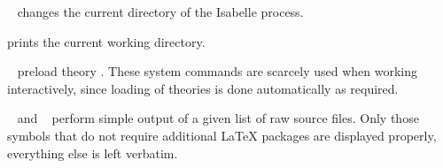 \begin{isabellebody}
\begin{isamarkuptext}
  \begin{descr}

  \item [\hyperlink{command.cd}{\mbox{\isa{\isacommand{cd}}}}~\isa{path}] changes the current directory
  of the Isabelle process.

  \item [\hyperlink{command.pwd}{\mbox{\isa{\isacommand{pwd}}}}] prints the current working directory.

  \item [\hyperlink{command.use-thy}{\mbox{\isa{\isacommand{use{\isacharunderscore}thy}}}}~\isa{A}] preload theory .
  These system commands are scarcely used when working interactively,
  since loading of theories is done automatically as required.

  \item [\hyperlink{command.display-drafts}{\mbox{\isa{\isacommand{display{\isacharunderscore}drafts}}}}~\isa{paths} and \hyperlink{command.print-drafts}{\mbox{\isa{\isacommand{print{\isacharunderscore}drafts}}}}~\isa{paths}] perform simple output of a given list
  of raw source files.  Only those symbols that do not require
  additional {\LaTeX} packages are displayed properly, everything else
  is left verbatim.

  \end{descr}%
\end{isamarkuptext}%
\isamarkuptrue%
%
\isadelimtheory
%
\endisadelimtheory
%
\isatagtheory
{}\isamarkupfalse%
%
\endisatagtheory
{\isafoldtheory}%
%
\isadelimtheory
%
\endisadelimtheory
\isanewline
\end{isabellebody}%
